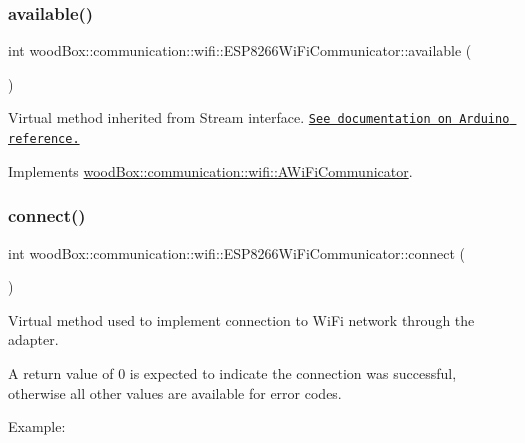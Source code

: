 \subsubsection{\texorpdfstring{available()}{available()}}
{\footnotesize\ttfamily int wood\+Box\+::communication\+::wifi\+::\+E\+S\+P8266\+Wi\+Fi\+Communicator\+::available (\begin{DoxyParamCaption}{ }\end{DoxyParamCaption})\hspace{0.3cm}{\ttfamily [virtual]}}

Virtual method inherited from Stream interface. \href{https://www.arduino.cc/reference/en/language/functions/communication/stream/streamavailable/}{\tt See documentation on Arduino reference.} 

Implements \mbox{\hyperlink{classwood_box_1_1communication_1_1wifi_1_1_a_wi_fi_communicator_a541a26bf14cf77c13cc960963944ba1d}{wood\+Box\+::communication\+::wifi\+::\+A\+Wi\+Fi\+Communicator}}.

\mbox{\label{classwood_box_1_1communication_1_1wifi_1_1_e_s_p8266_wi_fi_communicator_ab3e1f12a851dc3ed6eb487c39178cb6f}} 
\subsubsection{\texorpdfstring{connect()}{connect()}}
{\footnotesize\ttfamily int wood\+Box\+::communication\+::wifi\+::\+E\+S\+P8266\+Wi\+Fi\+Communicator\+::connect (\begin{DoxyParamCaption}{ }\end{DoxyParamCaption})\hspace{0.3cm}{\ttfamily [virtual]}}

Virtual method used to implement connection to Wi\+Fi network through the adapter.

A return value of 0 is expected to indicate the connection was successful, otherwise all other values are available for error codes.

Example\+:


